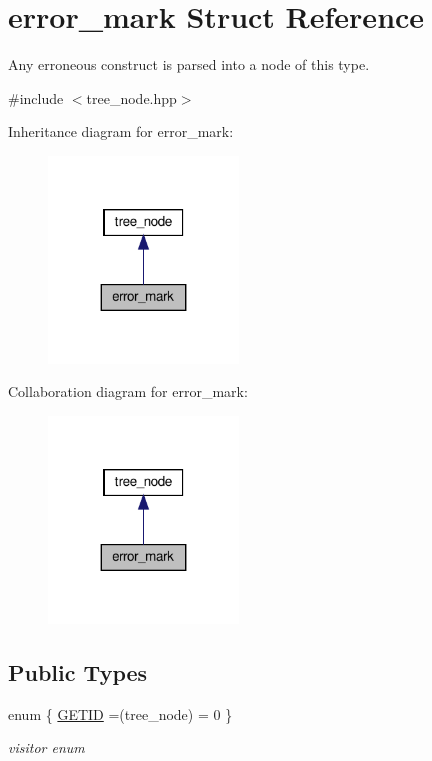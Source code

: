 \hypertarget{structerror__mark}{}\section{error\+\_\+mark Struct Reference}
\label{structerror__mark}


Any erroneous construct is parsed into a node of this type.  




{\ttfamily \#include $<$tree\+\_\+node.\+hpp$>$}



Inheritance diagram for error\+\_\+mark\+:
\nopagebreak
\begin{figure}[H]
\begin{center}
\leavevmode
\includegraphics[width=143pt]{d3/d6f/structerror__mark__inherit__graph}
\end{center}
\end{figure}


Collaboration diagram for error\+\_\+mark\+:
\nopagebreak
\begin{figure}[H]
\begin{center}
\leavevmode
\includegraphics[width=143pt]{d3/de5/structerror__mark__coll__graph}
\end{center}
\end{figure}
\subsection*{Public Types}
\begin{DoxyCompactItemize}
\item 
enum \{ \hyperlink{structerror__mark_a87b50c3f099b89b0f7ae1b9db42b7bc0a3bf6c082318d4e7cd259d71946ec7448}{G\+E\+T\+ID} =(tree\+\_\+node) = 0
 \}\begin{DoxyCompactList}\small\item\em visitor enum \end{DoxyCompactList}
\end{DoxyCompactItemize}
